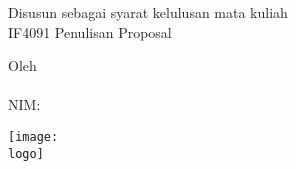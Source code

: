 
\clearpage
\thispagestyle{empty}

\begin{center}

    \Large\bfseries\MakeUppercase{\judulta}

    \vfill

    \Large \subtitle

    \vfill

    \large Disusun sebagai syarat kelulusan mata kuliah\\
    IF4091 Penulisan Proposal

    \vfill

    \large Oleh \\[0.3em]
    \MakeUppercase{\penulis} \\[0.2em]
    NIM: \nim

    \vfill

    \texttt{[image: \\logo]}

    \vfill

    \large\MakeUppercase{
        \prodi \\[0.2em]
        \fakultas \\[0.2em]
        \itb \\[0.5em]
        \bulan\ \tahun
    }

\end{center}

\clearpage
